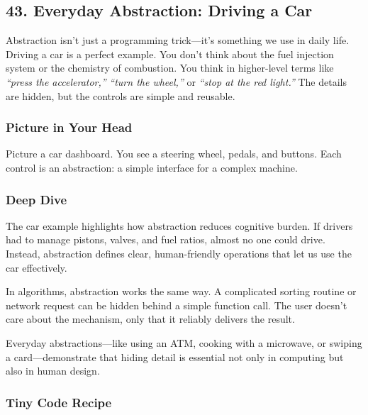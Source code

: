 \documentclass[
  letterpaper,
  DIV=11,
  numbers=noendperiod]{scrreprt}
\begin{document}
\subsection{43. Everyday Abstraction: Driving a
Car}\label{everyday-abstraction-driving-a-car}

Abstraction isn't just a programming trick---it's something we use in
daily life. Driving a car is a perfect example. You don't think about
the fuel injection system or the chemistry of combustion. You think in
higher-level terms like \emph{``press the accelerator,''} \emph{``turn
the wheel,''} or \emph{``stop at the red light.''} The details are
hidden, but the controls are simple and reusable.

\subsubsection{Picture in Your Head}\label{picture-in-your-head-42}

Picture a car dashboard. You see a steering wheel, pedals, and buttons.
Each control is an abstraction: a simple interface for a complex
machine.

\subsubsection{Deep Dive}\label{deep-dive-12}

The car example highlights how abstraction reduces cognitive burden. If
drivers had to manage pistons, valves, and fuel ratios, almost no one
could drive. Instead, abstraction defines clear, human-friendly
operations that let us use the car effectively.

In algorithms, abstraction works the same way. A complicated sorting
routine or network request can be hidden behind a simple function call.
The user doesn't care about the mechanism, only that it reliably
delivers the result.

Everyday abstractions---like using an ATM, cooking with a microwave, or
swiping a card---demonstrate that hiding detail is essential not only in
computing but also in human design.

\subsubsection{Tiny Code Recipe}\label{tiny-code-recipe-40}
\end{document}
